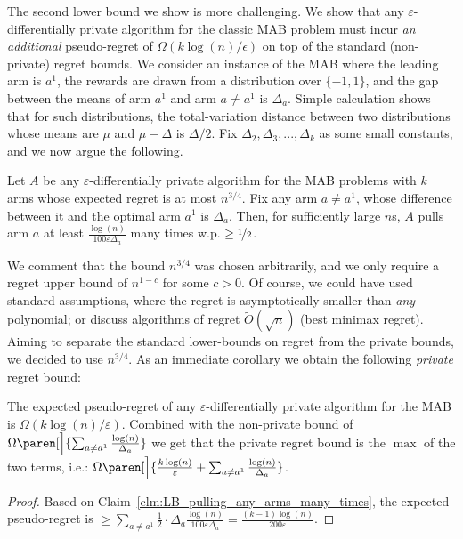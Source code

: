 \documentclass{article}
\DeclarePairedDelimiter{\paren}()
\begin{document}
The second lower bound we show is more challenging. We show that any $\varepsilon$-differentially private algorithm for the classic MAB problem must incur \emph{an additional} pseudo-regret of $\Omega( k\log(n)/\epsilon)$ on top of the standard (non-private) regret bounds.  We consider an instance of the MAB where the leading arm is $a^1$, the rewards are drawn from a distribution over $\{-1,1\}$, and the gap between the means of arm $a^1$ and arm $a\neq a^1$ is $\Delta_a$. Simple calculation shows that for such distributions, the total-variation distance between two distributions whose means are $\mu$ and $\mu-\Delta$ is $\Delta/2$. Fix $\Delta_2, \Delta_3,...,\Delta_k$ as some small constants, and we now argue the following.
\begin{claim}
\label{clm:LB_pulling_any_arms_many_times}
Let $A$ be any $\varepsilon$-differentially private algorithm for the MAB problems with $k$ arms whose expected regret is at most $n^{3/4}$. Fix any arm $a\neq a^1$, whose difference between it and the optimal arm $a^1$ is $\Delta_a$. Then, for sufficiently large $n$s, $A$ pulls arm $a$ at least $\tfrac {\log(n)}{100\varepsilon\Delta_a}$ many times w.p. $\geq \nicefrac 1 2$.
\end{claim}
We comment that the bound $n^{3/4}$ was chosen arbitrarily, and we only require a regret upper bound of $n^{1-c}$ for some $c>0$. Of course, we could have used standard assumptions, where the regret is asymptotically smaller than \emph{any} polynomial; or discuss algorithms of regret $\tilde O(\sqrt n)$ (best minimax regret). Aiming to separate the standard lower-bounds on regret from the private bounds, we decided to use $n^{3/4}$.
As an immediate corollary we obtain the following \emph{private} regret bound:
\begin{corollary}
\label{cor:LB_private_MAB}
The expected pseudo-regret of any $\varepsilon$-differentially private algorithm for the MAB is $\Omega(k\log(n)/\varepsilon)$. Combined with the non-private bound of $\Omega\paren[\Big]{\sum_{a\neq a^1} \tfrac{\log(n)}{\Delta_a}}$ we get that the private regret bound is the $\max$ of the two terms, i.e.: $\Omega\paren[\Big]{\tfrac {k\log(n)}{\varepsilon}+\sum_{a\neq a^1} \tfrac{\log(n)}{\Delta_a}}$.
\end{corollary}
{
  \vspace{-5mm}
  \begin{proof}
    Based on Claim~\ref{clm:LB_pulling_any_arms_many_times}, the expected pseudo-regret is $\geq \sum_{a\neq a^1} \tfrac 1 2 \cdot \Delta_a \tfrac{\log(n)}{100 \varepsilon\Delta_a} = \tfrac{(k-1)\log(n)}{200\varepsilon}$.
  \end{proof}
  \vspace{-6mm}
}
\end{document}
